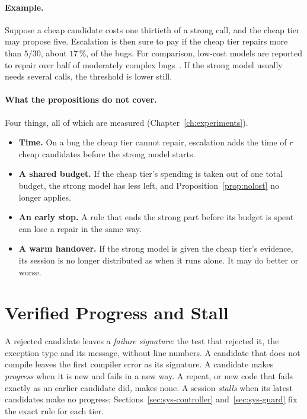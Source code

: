 \paragraph{Example.} Suppose a cheap candidate costs one thirtieth of a strong
call, and the cheap tier may propose five. Escalation is then sure to pay if
the cheap tier repairs more than $5/30$, about $17\,\%$, of the bugs. For
comparison, low-cost models are reported to repair over half of moderately
complex bugs~\citep{liu2026rethinking}. If the strong model usually needs
several calls, the threshold is lower still.

\paragraph{What the propositions do not cover.} Four things, all of which are
measured (Chapter~\ref{ch:experiments}).
\begin{itemize}
\item \textbf{Time.} On a bug the cheap tier cannot repair, escalation adds
the time of $r$ cheap candidates before the strong model starts.
\item \textbf{A shared budget.} If the cheap tier's spending is taken out of
one total budget, the strong model has less left, and
Proposition~\ref{prop:nolost} no longer applies.
\item \textbf{An early stop.} A rule that ends the strong part before its
budget is spent can lose a repair in the same way.
\item \textbf{A warm handover.} If the strong model is given the cheap tier's
evidence, its session is no longer distributed as when it runs alone. It may
do better or worse.
\end{itemize}

\section{Verified Progress and Stall}
\label{sec:bg-stall}

A rejected candidate leaves a \emph{failure signature}: the test that rejected
it, the exception type and its message, without line numbers. A candidate that
does not compile leaves the first compiler error as its signature. A candidate
makes \emph{progress} when it is new and fails in a new way. A repeat, or new
code that fails exactly as an earlier candidate did, makes none. A session
\emph{stalls} when its latest candidates make no progress;
Sections~\ref{sec:sys-controller} and~\ref{sec:sys-guard} fix the exact rule
for each tier.

